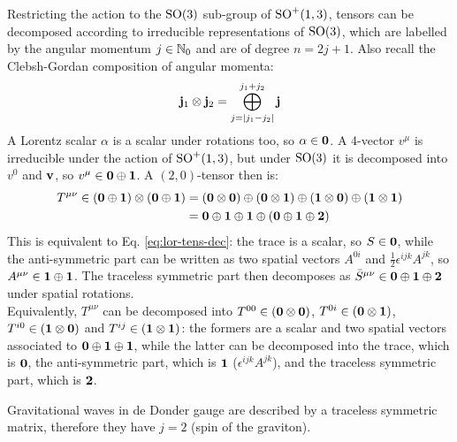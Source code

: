 Restricting the action to the $ \mathrm{SO}(3) $ sub-group of $ \mathrm{SO}^+(1,3) $, tensors can be decomposed according to irreducible representations of $ \mathrm{SO}(3) $, which are labelled by the angular momentum $ j \in \mathbb{N}_0 $ and are of degree $ n = 2j + 1 $. Also recall the Clebsh-Gordan composition of angular momenta:
\begin{equation}
  \mathbf{j}_1 \otimes \mathbf{j}_2 = \bigoplus_{j = \left\lvert j_1 - j_2\right\rvert}^{j_1 + j_2} \mathbf{j}
\end{equation}
A Lorentz scalar $ \alpha $ is a scalar under rotations too, so $ \alpha \in \mathbf{0} $. A 4-vector $ v^\mu $ is irreducible under the action of $ \mathrm{SO}^+(1,3) $, but under $ \mathrm{SO}(3) $ it is decomposed into $ v^0 $ and $ \mathbf{v} $, so $ v^\mu \in \mathbf{0} \oplus \mathbf{1} $. A $ (2,0) $-tensor then is:
\begin{equation*}
  \begin{split}
    T^{\mu \nu} \in \left( \mathbf{0} \oplus \mathbf{1} \right) \otimes \left( \mathbf{0} \oplus \mathbf{1} \right)
    &= \left( \mathbf{0} \otimes \mathbf{0} \right) \oplus \left( \mathbf{0} \otimes \mathbf{1} \right) \oplus \left( \mathbf{1} \otimes \mathbf{0} \right) \oplus \left( \mathbf{1} \otimes \mathbf{1} \right) \\
    &= \mathbf{0} \oplus \mathbf{1} \oplus \mathbf{1} \oplus \left( \mathbf{0} \oplus \mathbf{1} \oplus \mathbf{2} \right)
  \end{split}
\end{equation*}
This is equivalent to Eq. \ref{eq:lor-tens-dec}: the trace is a scalar, so $ S \in \mathbf{0} $, while the anti-symmetric part can be written as two spatial vectors $ A^{0i} $ and $ \frac{1}{2} \epsilon^{ijk} A^{jk} $, so $ A^{\mu \nu} \in \mathbf{1} \oplus \mathbf{1} $. The traceless symmetric part then decomposes as $ \bar{S}^{\mu \nu} \in \mathbf{0} \oplus \mathbf{1} \oplus \mathbf{2} $ under spatial rotations.\\
Equivalently, $ T^{\mu \nu} $ can be decomposed into $ T^{00} \in \left( \mathbf{0} \otimes \mathbf{0} \right) $, $ T^{0i} \in \left( \mathbf{0} \otimes \mathbf{1} \right) $, $ T^{i0} \in \left( \mathbf{1} \otimes \mathbf{0} \right) $ and $ T^{ij} \in \left( \mathbf{1} \otimes \mathbf{1} \right) $: the formers are a scalar and two spatial vectors associated to $ \mathbf{0} \oplus \mathbf{1} \oplus \mathbf{1} $, while the latter can be decomposed into the trace, which is $ \mathbf{0} $, the anti-symmetric part, which is $ \mathbf{1} $ ($ \epsilon^{ijk} A^{jk} $), and the traceless symmetric part, which is $ \mathbf{2} $.

\begin{example}{}{}
  Gravitational waves in de Donder gauge are described by a traceless symmetric matrix, therefore they have $ j = 2 $ (spin of the graviton).
\end{example}

